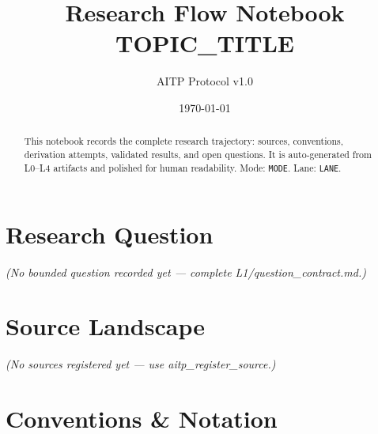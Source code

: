 \documentclass[11pt,a4paper]{article}
\title{\textbf{Research Flow Notebook}\\[0.4em]
  \large {{TOPIC_TITLE}}}
\author{AITP Protocol v1.0}
\date{\today}
\numberwithin{equation}{section}
\begin{document}
\maketitle

\begin{abstract}
This notebook records the complete research trajectory: sources,
conventions, derivation attempts, validated results, and open questions.
It is auto-generated from L0--L4 artifacts and polished for human readability.
Mode: \texttt{{{MODE}}}.  Lane: \texttt{{{LANE}}}.
\end{abstract}

\tableofcontents
\newpage


\section{Research Question}

\begin{resultbox}
\textit{(No bounded question recorded yet — complete L1/question\_contract.md.)}
\end{resultbox}


\section{Source Landscape}

\textit{(No sources registered yet — use aitp\_register\_source.)}


\section{Conventions \& Notation}
\end{document}
